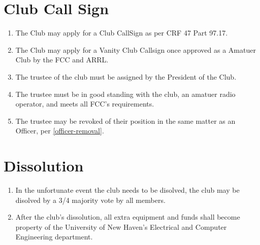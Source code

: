\documentclass[a4paper,12pt]{article}
\begin{document}
\section{Club Call Sign}
\begin{enumerate}[label=\thesection.\arabic*.]
  \item The Club may apply for a Club CallSign as per CRF 47 Part 97.17.
  \item The Club may apply for a Vanity Club Callsign once approved as a Amatuer Club by the FCC and ARRL.
  \item The trustee of the club must be assigned by the President of the Club.
  \item The trustee must be in good standing with the club, an amatuer radio operator, and meets all FCC's requirements.
  \item The trustee may be revoked of their position in the same matter as an Officer, per \cref{officer-removal}.
\end{enumerate}

\section{Dissolution}
\begin{enumerate}[label=\thesection.\arabic*.]
  \item In the unfortunate event the club needs to be disolved, the club may be disolved by a 3/4 majority vote by all members.
  \item After the club's dissolution, all extra equipment and funds shall become property of the University of New Haven's Electrical and Computer Engineering department.
\end{enumerate}
\end{document}
